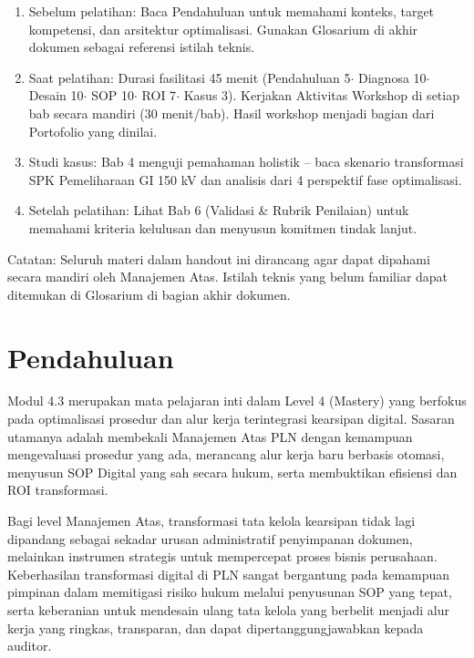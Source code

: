 \documentclass[12pt,a4paper]{report}
\begin{document}
\begin{plnbox}
\begin{enumerate}[leftmargin=*]
    \item Sebelum pelatihan: Baca Pendahuluan untuk memahami konteks, target kompetensi, dan arsitektur optimalisasi. Gunakan Glosarium di akhir dokumen sebagai referensi istilah teknis.
    \item Saat pelatihan: Durasi fasilitasi 45 menit (Pendahuluan 5$\cdot$ Diagnosa 10$\cdot$ Desain 10$\cdot$ SOP 10$\cdot$ ROI 7$\cdot$ Kasus 3). Kerjakan Aktivitas Workshop di setiap bab secara mandiri (30 menit/bab). Hasil workshop menjadi bagian dari Portofolio yang dinilai.
    \item Studi kasus: Bab 4 menguji pemahaman holistik -- baca skenario transformasi SPK Pemeliharaan GI 150 kV dan analisis dari 4 perspektif fase optimalisasi.
    \item Setelah pelatihan: Lihat Bab 6 (Validasi \& Rubrik Penilaian) untuk memahami kriteria kelulusan dan menyusun komitmen tindak lanjut.
\end{enumerate}
\end{plnbox}

\vspace{0.5cm}
\noindent\small Catatan: Seluruh materi dalam handout ini dirancang agar dapat dipahami secara mandiri oleh Manajemen Atas. Istilah teknis yang belum familiar dapat ditemukan di Glosarium di bagian akhir dokumen.

\tableofcontents

\chapter*{Pendahuluan}
\setcounter{section}{0}
\renewcommand{\thesection}{\Alph{section}}

Modul 4.3 merupakan mata pelajaran inti dalam Level 4 (Mastery) yang berfokus pada optimalisasi prosedur dan alur kerja terintegrasi kearsipan digital. Sasaran utamanya adalah membekali Manajemen Atas PLN dengan kemampuan mengevaluasi prosedur yang ada, merancang alur kerja baru berbasis otomasi, menyusun SOP Digital yang sah secara hukum, serta membuktikan efisiensi dan ROI transformasi.

Bagi level Manajemen Atas, transformasi tata kelola kearsipan tidak lagi dipandang sebagai sekadar urusan administratif penyimpanan dokumen, melainkan instrumen strategis untuk mempercepat proses bisnis perusahaan. Keberhasilan transformasi digital di PLN sangat bergantung pada kemampuan pimpinan dalam memitigasi risiko hukum melalui penyusunan SOP yang tepat, serta keberanian untuk mendesain ulang tata kelola yang berbelit menjadi alur kerja yang ringkas, transparan, dan dapat dipertanggungjawabkan kepada auditor.
\end{document}
